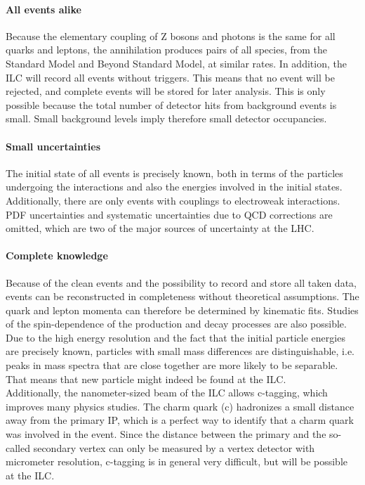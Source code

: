 \paragraph{All events alike}
Because the elementary coupling of Z bosons and photons is the same for all quarks and leptons, the \positron\electron annihilation produces pairs of all species, from the Standard Model and Beyond Standard Model, at similar rates.
In addition, the ILC will record all events without triggers.
This means that no event will be rejected, and complete events will be stored for later analysis.
This is only possible because the total number of detector hits from background events is small.
Small background levels imply therefore small detector occupancies.

\paragraph{Small uncertainties}
The initial state of all events is precisely known, both in terms of the particles undergoing the interactions and also the energies involved in the initial states.
Additionally, there are only events with couplings to electroweak interactions.\\
PDF uncertainties and systematic uncertainties due to QCD corrections are omitted, which are two of the major sources of uncertainty at the LHC.

\paragraph{Complete knowledge}
Because of the clean events and the possibility to record and store all taken data, events can be reconstructed in completeness without theoretical assumptions.
The quark and lepton momenta can therefore be determined by kinematic fits.
Studies of the spin-dependence of the production and decay processes are also possible.\\
Due to the high energy resolution and the fact that the initial particle energies are precisely known, particles with small mass differences are distinguishable, i.e. peaks in mass spectra that are close together are more likely to be separable.
That means that new particle might indeed be found at the ILC.\\
Additionally, the nanometer-sized beam of the ILC allows c-tagging, which improves many physics studies.
The charm quark (c) hadronizes a small distance away from the primary IP, which is a perfect way to identify that a charm quark was involved in the event.
Since the distance between the primary and the so-called secondary vertex can only be measured by a vertex detector with micrometer resolution, c-tagging is in general very difficult, but will be possible at the ILC.

